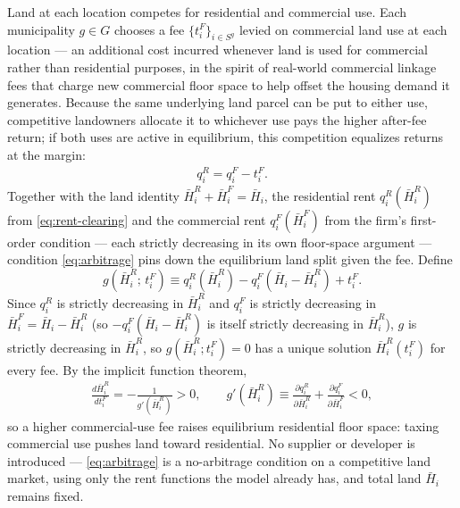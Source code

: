 \documentclass[12pt, a4paper]{article}
\theoremstyle{definition}
\begin{document}
Land at each location competes for residential and commercial use. Each municipality $g \in G$ chooses a fee $\{t_i^F\}_{i \in S^g}$ levied on commercial land use at each location — an additional cost incurred whenever land is used for commercial rather than residential purposes, in the spirit of real-world commercial linkage fees that charge new commercial floor space to help offset the housing demand it generates. Because the same underlying land parcel can be put to either use, competitive landowners allocate it to whichever use pays the higher after-fee return; if both uses are active in equilibrium, this competition equalizes returns at the margin:
\begin{align}
    \label{eq:arbitrage}
    q_i^R = q_i^F - t_i^F.
\end{align}
Together with the land identity $\bar{H}_i^R + \bar{H}_i^F = \bar{H}_i$, the residential rent $q_i^R(\bar{H}_i^R)$ from \eqref{eq:rent-clearing} and the commercial rent $q_i^F(\bar{H}_i^F)$ from the firm's first-order condition — each strictly decreasing in its own floor-space argument — condition \eqref{eq:arbitrage} pins down the equilibrium land split given the fee. Define
\[
g(\bar{H}_i^R;\, t_i^F) \equiv q_i^R(\bar{H}_i^R) - q_i^F(\bar{H}_i - \bar{H}_i^R) + t_i^F.
\]
Since $q_i^R$ is strictly decreasing in $\bar{H}_i^R$ and $q_i^F$ is strictly decreasing in $\bar{H}_i^F = \bar{H}_i - \bar{H}_i^R$ (so $-q_i^F(\bar{H}_i-\bar{H}_i^R)$ is itself strictly decreasing in $\bar{H}_i^R$), $g$ is strictly decreasing in $\bar{H}_i^R$, so $g(\bar{H}_i^R;t_i^F)=0$ has a unique solution $\bar{H}_i^R(t_i^F)$ for every fee. By the implicit function theorem,
\begin{align}
    \label{eq:landsplit}
\frac{d\bar{H}_i^R}{dt_i^F} = -\frac{1}{g'(\bar{H}_i^R)} > 0, \qquad
g'(\bar{H}_i^R) \equiv \frac{\partial q_i^R}{\partial \bar{H}_i^R} + \frac{\partial q_i^F}{\partial \bar{H}_i^F} < 0,
\end{align}
so a higher commercial-use fee raises equilibrium residential floor space: taxing commercial use pushes land toward residential. No supplier or developer is introduced — \eqref{eq:arbitrage} is a no-arbitrage condition on a competitive land market, using only the rent functions the model already has, and total land $\bar{H}_i$ remains fixed.
\end{document}
